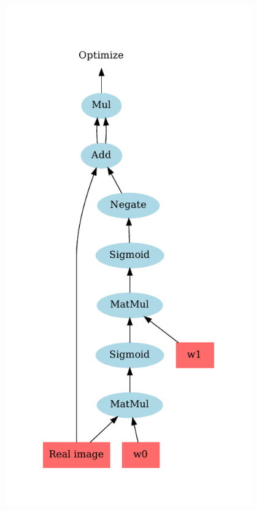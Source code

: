 \documentclass{Bredelebeamer}
\begin{document}
\begin{frame}
\begin{columns}
\begin{column}{0.5\textwidth}
	\includegraphics[width=0.8\textwidth]{sq_diff_all.pdf}
\end{column}
\end{columns}
\end{frame}
\end{document}
